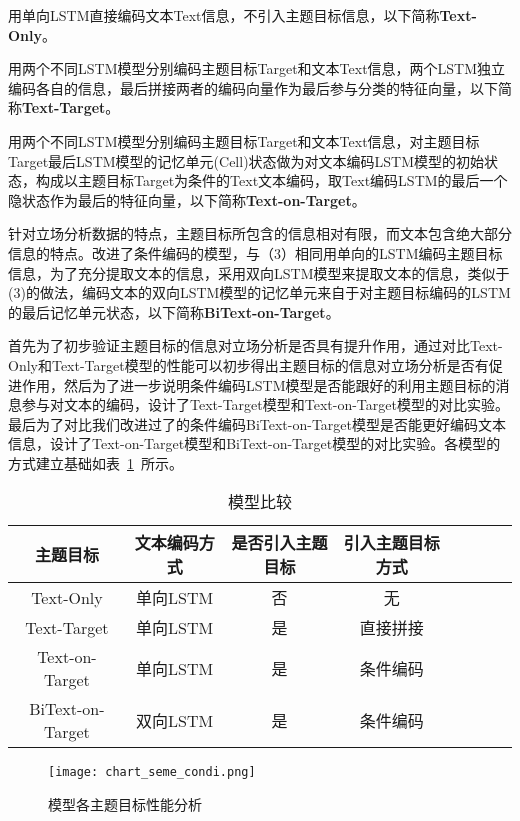 用单向LSTM直接编码文本Text信息，不引入主题目标信息，以下简称\textbf{Text-Only}。


用两个不同LSTM模型分别编码主题目标Target和文本Text信息，两个LSTM独立编码各自的信息，最后拼接两者的编码向量作为最后参与分类的特征向量，以下简称\textbf{Text-Target}。

用两个不同LSTM模型分别编码主题目标Target和文本Text信息，对主题目标Target最后LSTM模型的记忆单元(Cell)状态做为对文本编码LSTM模型的初始状态，构成以主题目标Target为条件的Text文本编码，取Text编码LSTM的最后一个隐状态作为最后的特征向量，以下简称\textbf{Text-on-Target}。

针对立场分析数据的特点，主题目标所包含的信息相对有限，而文本包含绝大部分信息的特点。改进了条件编码的模型，与（3）相同用单向的LSTM编码主题目标信息，为了充分提取文本的信息，采用双向LSTM模型来提取文本的信息，类似于(3)的做法，编码文本的双向LSTM模型的记忆单元来自于对主题目标编码的LSTM的最后记忆单元状态，以下简称\textbf{BiText-on-Target}。

首先为了初步验证主题目标的信息对立场分析是否具有提升作用，通过对比Text-Only和Text-Target模型的性能可以初步得出主题目标的信息对立场分析是否有促进作用，然后为了进一步说明条件编码LSTM模型是否能跟好的利用主题目标的消息参与对文本的编码，设计了Text-Target模型和Text-on-Target模型的对比实验。最后为了对比我们改进过了的条件编码BiText-on-Target模型是否能更好编码文本信息，设计了Text-on-Target模型和BiText-on-Target模型的对比实验。各模型的方式建立基础如表~\ref{model_list}~所示。
\begin{table}[htbp]
	\caption[table123]{模型比较}
	\label{model_list}
	\vspace{0.5em}\centering\wuhao
	\begin{tabular}{cccccccc}
		\toprule[1.5pt]
		主题目标&文本编码方式&是否引入主题目标&引入主题目标方式 \\
		\midrule[1pt]
		Text-Only&单向LSTM&否&无\\
		Text-Target&单向LSTM&是&直接拼接\\
		Text-on-Target&单向LSTM&是&条件编码\\
		BiText-on-Target&双向LSTM&是&条件编码\\
		\bottomrule[1.5pt]
	\end{tabular}
\end{table}

\begin{figure}[htbp]
	\centering
	\texttt{[image: chart\_seme\_condi.png]}
	\caption[rnn_vanish]{模型各主题目标性能分析}
	\label{semeval_model_char}
\end{figure}



